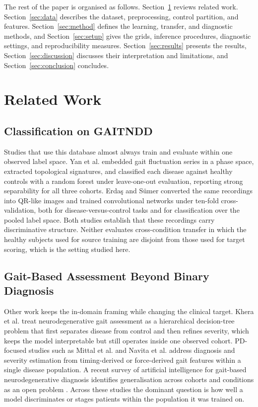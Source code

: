 \documentclass[conference]{IEEEtran}
\begin{document}
The rest of the paper is organised as follows. Section~\ref{sec:related} reviews related work. Section~\ref{sec:data} describes the dataset, preprocessing, control partition, and features. Section~\ref{sec:method} defines the learning, transfer, and diagnostic methods, and Section~\ref{sec:setup} gives the grids, inference procedures, diagnostic settings, and reproducibility measures. Section~\ref{sec:results} presents the results, Section~\ref{sec:discussion} discusses their interpretation and limitations, and Section~\ref{sec:conclusion} concludes.

\section{Related Work}
\label{sec:related}

\subsection{Classification on GAITNDD}
Studies that use this database almost always train and evaluate within one observed label space. Yan et al. \cite{yan2020tma} embedded gait fluctuation series in a phase space, extracted topological signatures, and classified each disease against healthy controls with a random forest under leave-one-out evaluation, reporting strong separability for all three cohorts. Erda\c{s} and S\"umer \cite{erdas2024qr} converted the same recordings into QR-like images and trained convolutional networks under ten-fold cross-validation, both for disease-versus-control tasks and for classification over the pooled label space. Both studies establish that these recordings carry discriminative structure. Neither evaluates cross-condition transfer in which the healthy subjects used for source training are disjoint from those used for target scoring, which is the setting studied here.

\subsection{Gait-Based Assessment Beyond Binary Diagnosis}
Other work keeps the in-domain framing while changing the clinical target. Khera et al. \cite{khera2025severity} treat neurodegenerative gait assessment as a hierarchical decision-tree problem that first separates disease from control and then refines severity, which keeps the model interpretable but still operates inside one observed cohort. PD-focused studies such as Mittal et al. \cite{mittal2025pd} and Navita et al. \cite{navita2025force} address diagnosis and severity estimation from timing-derived or force-derived gait features within a single disease population. A recent survey of artificial intelligence for gait-based neurodegenerative diagnosis identifies generalisation across cohorts and conditions as an open problem \cite{rao2024gaitsurvey}. Across these studies the dominant question is how well a model discriminates or stages patients within the population it was trained on.
\end{document}
